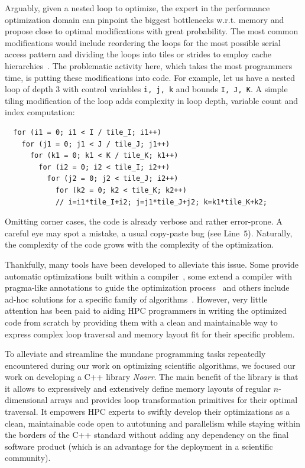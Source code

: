 Arguably, given a nested loop to optimize, the expert in the performance optimization domain can pinpoint the biggest bottlenecks w.r.t. memory and propose close to optimal modifications with great probability. The most common modifications would include reordering the loops for the most possible serial access pattern and dividing the loops into tiles or strides to employ cache hierarchies~\cite{wolf1991data}. The problematic activity here, which takes the most programmers time, is putting these modifications into code. For example, let us have a nested loop of depth 3 with control variables \texttt{i, j, k} and bounds \texttt{I, J, K}. A simple tiling modification of the loop adds complexity in loop depth, variable count and index computation: 
\begin{verbatim}
  for (i1 = 0; i1 < I / tile_I; i1++)
    for (j1 = 0; j1 < J / tile_J; j1++)
      for (k1 = 0; k1 < K / tile_K; k1++)
        for (i2 = 0; i2 < tile_I; i2++)
          for (j2 = 0; j2 < tile_J; i2++)
            for (k2 = 0; k2 < tile_K; k2++)
            // i=i1*tile_I+i2; j=j1*tile_J+j2; k=k1*tile_K+k2;
\end{verbatim}
Omitting corner cases, the code is already verbose and rather error-prone. A careful eye may spot a mistake, a usual copy-paste bug (see Line~$5$).
Naturally, the complexity of the code grows with the complexity of the optimization.

Thankfully, many tools have been developed to alleviate this issue. Some provide automatic optimizations built within a compiler~\cite{trifunovic2010graphite,grosser2012polly}, some extend a compiler with pragma-like annotations to guide the optimization process~\cite{donadio2005language,yi2007poet,chen2008chill,namjoshi2016loopy} and others include ad-hoc solutions for a specific family of algorithms~\cite{9485033,AFANASYEV2021100707}. However, very little attention has been paid to aiding HPC programmers in writing the optimized code from scratch by providing them with a clean and maintainable way to express complex loop traversal and memory layout fit for their specific problem.

To alleviate and streamline the mundane programming tasks repeatedly encountered during our work on optimizing scientific algorithms, we focused our work on developing a C++ library \emph{Noarr}. The main benefit of the library is that it allows to expressively and extensively define memory layouts of regular $n$-dimensional arrays and provides loop transformation primitives for their optimal traversal. It empowers HPC experts to swiftly develop their optimizations as a clean, maintainable code open to autotuning and parallelism while staying within the borders of the C++ standard without adding any dependency on the final software product (which is an advantage for the deployment in a scientific community).

